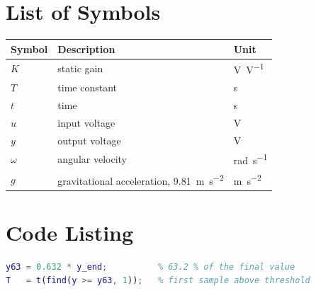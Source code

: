 \documentclass[state=Report]{mcidoc}
\newcounter{romanpage}
\begin{document}
\chapter{List of Symbols}
\begingroup
\setlength{\parfillskip}{0pt plus 1fil}
\noindent
\begin{tabularx}{\textwidth}{l X l}
  \toprule
  Symbol & Description & Unit \\
  \midrule
  $K$ & static gain & \unit{\volt\per\volt} \\
  $T$ & time constant & \unit{\second} \\
  $t$ & time & \unit{\second} \\
  $u$ & input voltage & \unit{\volt} \\
  $y$ & output voltage & \unit{\volt} \\
  $\omega$ & angular velocity & \unit{\radian\per\second} \\
  $g$ & gravitational acceleration, \qty{9.81}{\metre\per\second\squared} & \unit{\metre\per\second\squared} \\
  \bottomrule
\end{tabularx}
\par
\endgroup

\chapter{Code Listing}
\begin{lstlisting}[language=Matlab, caption={Identification of the time constant}]
y63 = 0.632 * y_end;          % 63.2 % of the final value
T   = t(find(y >= y63, 1));   % first sample above threshold
\end{lstlisting}

\clearpage
{}
\setcounter{page}{\value{romanpage}}

\printbibliography[heading=bibintoc]
\listoffigures
\listoftables
\end{document}
